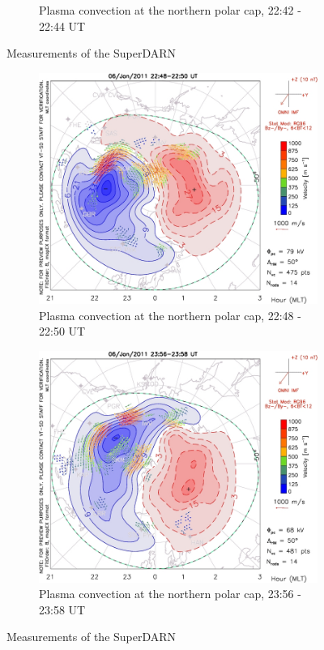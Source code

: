 \documentclass[10pt,a4paper]{article}
\begin{document}
\begin{figure}[h]
\begin{subfigure}[h]{.5\textwidth}
	\caption{Plasma convection at the northern polar cap, 22:42 - 22:44 UT}
	\label{darn7}
\end{subfigure}
	\caption{Measurements of the SuperDARN}
	\label{darn}
\end{figure}

\begin{figure}[h]
\begin{subfigure}[h]{.5\textwidth}
	\centering
	\includegraphics[width=.8\linewidth]{pot_1449168502.jpg}
	\caption{Plasma convection at the northern polar cap, 22:48 - 22:50 UT}
	\label{darn8}
\end{subfigure}
\begin{subfigure}[h]{.5\textwidth}
	\centering
	\includegraphics[width=.8\linewidth]{pot_1449173267.jpg}
	\caption{Plasma convection at the northern polar cap, 23:56 - 23:58 UT}
	\label{darn10}
\end{subfigure}

\caption{Measurements of the SuperDARN}
\label{darnn}
\end{figure}
\end{document}
